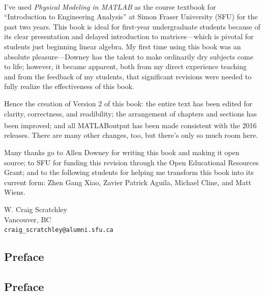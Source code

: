\documentclass[
]{book}
\newcommand{\myreg}{\textsuperscript{{\tiny \textregistered}}}
\newcommand{\thetitle}{Physical Modeling in MATLAB\myreg}
\begin{document}
I've used \textit{\thetitle} as the course
textbook for ``Introduction to Engineering Analysis'' at Simon Fraser
University (SFU) for the past two years. This book is ideal for
first-year undergraduate students because of its clear presentation and
delayed introduction to matrices---which is pivotal for students
just beginning linear algebra.  My first time using this book was an
absolute pleasure---Downey has the talent to make ordinarily dry
subjects come to life; however, it became apparent, both from my direct
experience teaching and from the feedback of my students, that
significant revisions were needed to fully realize the effectiveness
of this book.

Hence the creation of Version 2 of this book: the entire text
has been edited for clarity, correctness, and readibility; the
arrangement of chapters and sections has been improved;
and all MATLAB\myreg output has been made consistent
with the 2016 releases. There are many other
changes, too, but there's only so much room here.

Many thanks go to Allen Downey for writing this book and making it open
source; to SFU for funding this revision through the Open Educational
Resources Grant; and to the following students for helping me transform
this book into its current form: Zhen Gang Xiao, Zavier Patrick Aguila,
Michael Cline, and Matt Wiens.

\noindent W. Craig Scratchley
\\
\noindent Vancouver, BC
\\
{\tt craig\_scratchley@alumni.sfu.ca}

\newpage

\begin{latexonly}
\chapter{Preface}
\end{latexonly}
\begin{htmlonly}
\chapter*{Preface} %
\end{htmlonly}
\end{document}
